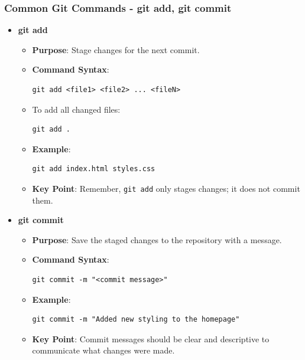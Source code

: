 \documentclass{beamer}
\begin{document}
\begin{frame}[fragile]
    \frametitle{Common Git Commands - git add, git commit}
    \begin{itemize}
        \item \textbf{git add}
        \begin{itemize}
            \item \textbf{Purpose}: Stage changes for the next commit.
            \item \textbf{Command Syntax}: 
            \begin{lstlisting}
git add <file1> <file2> ... <fileN>
            \end{lstlisting}
            \item To add all changed files:
            \begin{lstlisting}
git add .
            \end{lstlisting}
            \item \textbf{Example}: 
            \begin{lstlisting}
git add index.html styles.css
            \end{lstlisting}
            \item \textbf{Key Point}: 
            Remember, \texttt{git add} only stages changes; it does not commit them.
        \end{itemize}
        
        \item \textbf{git commit}
        \begin{itemize}
            \item \textbf{Purpose}: Save the staged changes to the repository with a message.
            \item \textbf{Command Syntax}: 
            \begin{lstlisting}
git commit -m "<commit message>"
            \end{lstlisting}
            \item \textbf{Example}: 
            \begin{lstlisting}
git commit -m "Added new styling to the homepage"
            \end{lstlisting}
            \item \textbf{Key Point}: 
            Commit messages should be clear and descriptive to communicate what changes were made.
        \end{itemize}
    \end{itemize}
\end{frame}
\end{document}
